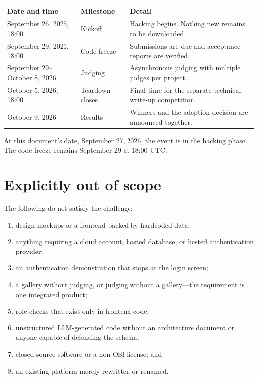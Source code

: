 \documentclass[11pt]{article}
\begin{document}
\begin{longtable}{@{}L{41mm}L{28mm}L{89mm}@{}}
\toprule
\textbf{Date and time} & \textbf{Milestone} & \textbf{Detail}\\
\midrule
\endhead%
September 26, 2026, 18:00 & Kickoff & Hacking begins. Nothing new remains to be downloaded.\\
September 29, 2026, 18:00 & Code freeze & Submissions are due and acceptance reports are verified.\\
September 29--October 8, 2026 & Judging & Asynchronous judging with multiple judges per project.\\
October 5, 2026, 18:00 & Teardown closes & Final time for the separate technical write-up competition.\\
October 9, 2026 & Results & Winners and the adoption decision are announced together.\\
\bottomrule
\end{longtable}

\begin{keybox}
At this document's date, September 27, 2026, the event is in the hacking phase. The code freeze remains September 29 at 18:00 UTC\@.
\end{keybox}

\section{Explicitly out of scope}

The following do not satisfy the challenge:

\begin{enumerate}
  \item design mockups or a frontend backed by hardcoded data;
  \item anything requiring a cloud account, hosted database, or hosted authentication provider;
  \item an authentication demonstration that stops at the login screen;
  \item a gallery without judging, or judging without a gallery---the requirement is one integrated product;
  \item role checks that exist only in frontend code;
  \item unstructured LLM-generated code without an architecture document or anyone capable of defending the schema;
  \item closed-source software or a non-OSI license; and
  \item an existing platform merely rewritten or renamed.
\end{enumerate}
\end{document}
